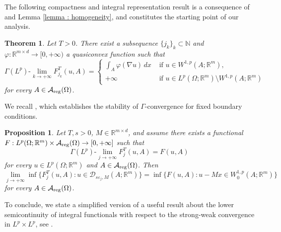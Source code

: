 \documentclass{article}
\newtheorem{proposition}[lemma]{Proposition}
\newtheorem{theorem}[lemma]{Theorem}
\theoremstyle{definition}
\newcommand{\e}{\varepsilon}
\newcommand{\f}{\varphi}
\newcommand{\N}{\mathbb{N}}
\newcommand{\R}{\mathbb{R}}
\newcommand{\A}{\mathcal{A}}
\begin{document}
The following compactness and integral representation result is a consequence of  \cite[Theorem 5.1]{AABPT} and Lemma \ref{lemma : homogeneity}, and constitutes the starting point of our analysis.

\begin{theorem}\label{thm : intrep}
Let $T>0$. There exist a subsequence $\{j_k\}_k\subset \N$ and $\f:\R^{m\times d}\to[0,+\infty)$ a quasiconvex function such that
    \begin{equation*}
    \Gamma(L^p)\text{-}\lim_{k\to+\infty} F^T_{j_k}(u,A) = \begin{cases}
            \displaystyle \int_{A} \f(\nabla u)\,dx & \text{ if } u\in W^{1,p}(A;\R^m), \\
            +\infty & \text{ if } u\in L^p(\Omega;\R^m)\setminus W^{1,p}(A;\R^m)
        \end{cases}
    \end{equation*}
    for every $A\in \A_{\rm reg}(\Omega)$.
\end{theorem}

We recall \cite[ Proposition 5.4]{AABPT}, which establishes the stability of $\Gamma$-convergence for fixed boundary conditions. 

\begin{proposition}\label{prop : boundary} Let $T,s>0$, $M\in\R^{m\times d}$, and assume there exists a functional $F: L^p(\Omega;\R^m)\times \A_{\rm reg}(\Omega)\to[0,+\infty]$ such that 
\begin{equation*}
    \Gamma(L^p)\text{-}\lim_{j\to+\infty} F^T_j(u,A) = F(u,A) 
\end{equation*}
    for every $u\in L^p(\Omega; \R^m)$ and $A\in \A_{\rm reg}(\Omega)$. Then
    \begin{equation*}
        \lim_{j\to+\infty}\inf\{F^T_j(u,A) : u\in \mathcal{D}_{s\e_j,M}(A; \R^m)\} = \inf \{F(u,A) : u-Mx\in W^{1,p}_0(A; \R^m)\}
    \end{equation*}
    for every $A\in \A_{\rm reg}(\Omega)$.
\end{proposition}

To conclude, we state a simplified version of a useful result about the lower semicontinuity of integral functionals with respect to the strong-weak convergence in $L^p\times L^p$, see \cite[Theorem 7.5]{FL}.
\end{document}
